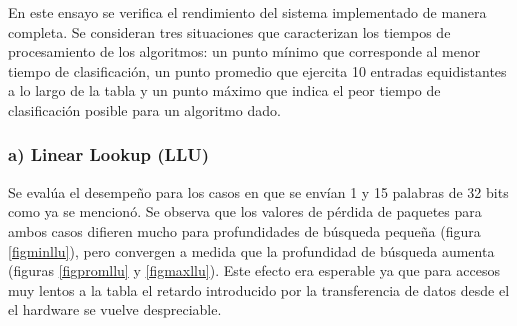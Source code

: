 En este ensayo se verifica el rendimiento del sistema implementado de manera completa. Se consideran tres situaciones que caracterizan los tiempos de procesamiento de los algoritmos: un punto mínimo que corresponde al menor tiempo de clasificación, un punto promedio que ejercita 10 entradas equidistantes a lo largo de la tabla y un punto máximo que indica el peor tiempo de clasificación posible para un algoritmo dado. 

\subsubsection{a) Linear Lookup (LLU)}
Se evalúa el desempeño para los casos en que se envían 1 y 15 palabras de 32 bits como ya se mencionó. Se observa que los valores de pérdida de paquetes para ambos casos difieren mucho para profundidades de búsqueda pequeña (figura \ref{figminllu}), pero convergen a medida que la profundidad de búsqueda aumenta (figuras \ref{figpromllu} y \ref{figmaxllu}). Este efecto era esperable ya que para accesos muy lentos a la tabla el retardo introducido por la transferencia de datos desde el  el hardware se vuelve despreciable.

